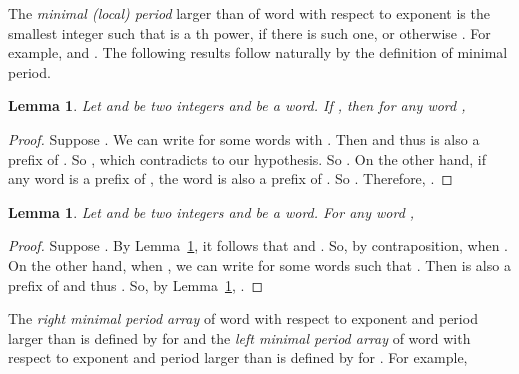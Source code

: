 \documentclass{article}
\newtheorem{lemma}[theorem]{Lemma}
\begin{document}
The \emph{minimal (local) period}  larger than  of
word  with respect to exponent  is the smallest integer 
such that  is a th power, if there is such
one, or otherwise . For example,
 and . The
following results follow naturally by the definition of minimal
period.


\begin{lemma}\label{lemma:mpexpd}
Let  and  be two integers and  be a word. If
, then for any word ,
  
\end{lemma}
\begin{proof}
Suppose . We can write  for some
words  with . Then  and thus  is also a
prefix of . So , which
contradicts to our hypothesis. So . On the
other hand, if any word  is a prefix of , the word  is
also a prefix of . So . Therefore,
.
\end{proof}


\begin{lemma}\label{lemma:mpshrk}
Let  and  be two integers and  be a word. For any
word ,
  
\end{lemma}
\begin{proof}
Suppose . By Lemma~\ref{lemma:mpexpd}, it
follows that  and . So, by contraposition,
 when . On the other
hand, when , we can write 
for some words  such that . Then  is
also a prefix of  and thus . So, by
Lemma~\ref{lemma:mpexpd}, .
\end{proof}





The \emph{right minimal period array} of word  with respect to
exponent  and period larger than  is defined by
 for  and the
\emph{left minimal period array} of word  with respect to
exponent  and period larger than  is defined by
 for . For
example,
\end{document}
